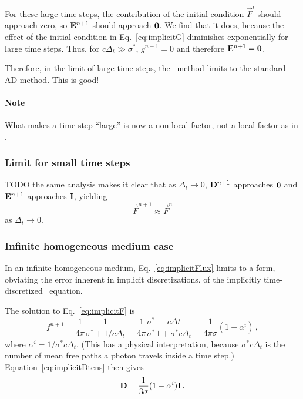 For these large time steps, the contribution of the initial condition
$\vec{F}^i$ should approach zero, so $\mathbf{E}^{n+1}$ should approach $
\mathbf{0}$. We find that it does, because the effect of the initial condition
in Eq.~\eqref{eq:implicitG} diminishes exponentially for large time steps. Thus,
for $c \Delta_t \gg \sigma^\ast$, $g^{n+1}=0$ and therefore
$\mathbf{E}^{n+1}=\mathbf{0}$.

Therefore, in the limit of large time steps, the \APone\ method limits to the
standard AD method. This is good!

\paragraph{Note} What makes a time step ``large'' is now a non-local factor,
not a local factor as in \Pone.

\subsubsection{Limit for small time steps}
TODO the same analysis makes it clear that as $\Delta_t \to 0$,
$\mathbf{D}^{n+1}$ approaches $\mathbf{0}$ and $\mathbf{E}^{n+1}$ approaches $\mathbf{I}$,
yielding
\begin{equation*}
  \vec{F}^{n+1} \approx \vec{F}^{n}
\end{equation*}
as $\Delta_t \to 0$.

\subsubsection{Infinite homogeneous medium case}
In an infinite homogeneous medium, Eq.~\eqref{eq:implicitFlux} limits to a
form, obviating the error inherent in implicit discretizations.
of the implicitly time-discretized \Pone\ equation.

The solution to Eq.~\eqref{eq:implicitF} is
\begin{equation*}
  f^{n+1}
  = \frac{1}{4\pi} \frac{1}{\sigma^\ast + 1 /c \Delta_t}
  = \frac{1}{4\pi} \frac{\sigma^\ast}{\sigma^\ast} \frac{c \Delta t}{1 + \sigma^\ast c \Delta_t}
  = \frac{1}{4\pi \sigma} ( 1 - \alpha^i) \,,
\end{equation*}
where $\alpha^i = 1/ \sigma^\ast c \Delta_t$. (This has a physical
interpretation, because $\sigma^\ast c \Delta_t$ is the number of mean free
paths a photon travels inside a time step.) Equation~\eqref{eq:implicitDtens}
then gives
\begin{equation*}
  \mathbf{D} = \frac{1}{3 \sigma} ( 1 - \alpha^i) \mathbf{I}\,.
\end{equation*}

